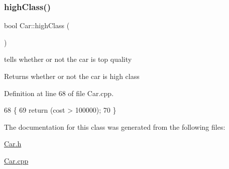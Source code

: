 \subsubsection{\texorpdfstring{high\+Class()}{highClass()}}
{\footnotesize\ttfamily bool Car\+::high\+Class (\begin{DoxyParamCaption}{ }\end{DoxyParamCaption})}

tells whether or not the car is top quality

\begin{DoxyReturn}{Returns}
whether or not the car is high class 
\end{DoxyReturn}


Definition at line 68 of file Car.\+cpp.


\begin{DoxyCode}
68                     \{
69     \textcolor{keywordflow}{return} (cost > 100000);
70 \}
\end{DoxyCode}


The documentation for this class was generated from the following files\+:\begin{DoxyCompactItemize}
\item 
\hyperlink{_car_8h}{Car.\+h}\item 
\hyperlink{_car_8cpp}{Car.\+cpp}\end{DoxyCompactItemize}
